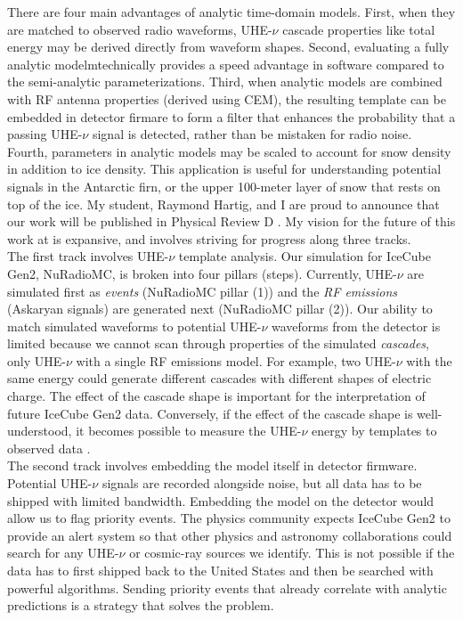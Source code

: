 \documentclass[../../../main.tex]{subfiles}
\begin{document}
There are four main advantages of analytic time-domain models. First, when they are matched to observed radio waveforms, UHE-$\nu$ cascade properties like total energy may be derived directly from waveform shapes. Second, evaluating a fully analytic modelmtechnically provides a speed advantage in software compared to the semi-analytic parameterizations. Third, when analytic models are combined with RF antenna properties (derived using CEM), the resulting template can be embedded in detector firmare to form a filter that enhances the probability that a passing UHE-$\nu$ signal is detected, rather than be mistaken for radio noise. Fourth, parameters in analytic models may be scaled to account for snow density in addition to ice density. This application is useful for understanding potential signals in the Antarctic firn, or the upper 100-meter layer of snow that rests on top of the ice.  My student, Raymond Hartig, and I are proud to announce that our work will be published in Physical Review D \cite{time}.  My vision for the future of this work at is expansive, and involves striving for progress along three tracks.
\\
\vspace{0.25cm}
The first track involves UHE-$\nu$ template analysis.  Our simulation for IceCube Gen2, NuRadioMC, is broken into four pillars (steps).  Currently, UHE-$\nu$ are simulated first as \textit{events} (NuRadioMC pillar (1)) and the \textit{RF emissions} (Askaryan signals) are generated next (NuRadioMC pillar (2)).  Our ability to match simulated waveforms to potential UHE-$\nu$ waveforms from the detector is limited because we cannot scan through properties of the simulated \textit{cascades}, only UHE-$\nu$ with a single RF emissions model.  For example, two UHE-$\nu$ with the same energy could generate different cascades with different shapes of electric charge.  The effect of the cascade shape is important for the interpretation of future IceCube Gen2 data.  Conversely, if the effect of the cascade shape is well-understood, it becomes possible to measure the UHE-$\nu$ energy by templates to observed data \cite{time}.
\\
\vspace{0.25cm}
The second track involves embedding the model itself in detector firmware.  Potential UHE-$\nu$ signals are recorded alongside noise, but all data has to be shipped with limited bandwidth.  Embedding the model on the detector would allow us to flag priority events.  The physics community expects IceCube Gen2 to provide an alert system so that other physics and astronomy collaborations could search for any UHE-$\nu$ or cosmic-ray sources we identify.  This is not possible if the data has to first shipped back to the United States and then be searched with powerful algorithms.  Sending priority events that already correlate with analytic predictions is a strategy that solves the problem.
\end{document}
